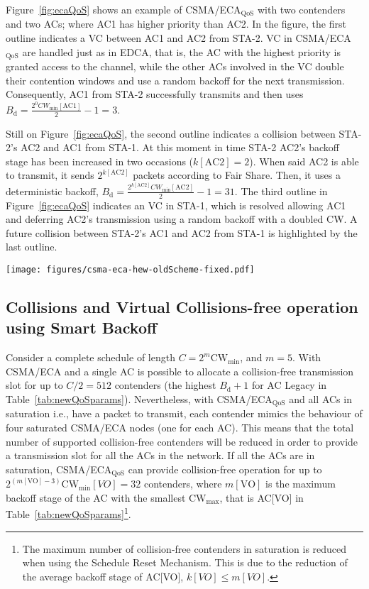 \documentclass[a4paper]{article}
\begin{document}
Figure~\ref{fig:ecaQoS} shows an example of CSMA/ECA$_{\text{QoS}}$ with two contenders and two ACs; where AC1 has higher priority than AC2. In the figure, the first outline indicates a VC between AC1 and AC2 from STA-2. VC in CSMA/ECA$_{\text{QoS}}$ are handled just as in EDCA, that is, the AC with the highest priority is granted access to the channel, while the other ACs involved in the VC double their contention windows and use a random backoff for the next transmission. Consequently, AC1 from STA-2 successfully transmits and then uses $B_{\text{d}}=\frac{2^{0}CW_{\min}[\text{AC1}]}{2}-1= 3$.

Still on Figure~\ref{fig:ecaQoS}, the second outline indicates a collision between STA-2's AC2 and AC1 from STA-1. At this moment in time STA-2 AC2's backoff stage has been increased in two occasions ($k[\text{AC2}]=2$). When said AC2 is able to transmit, it sends $2^{k[\text{AC2}]}$ packets according to Fair Share. Then, it uses a deterministic backoff, $B_{\text{d}}=\frac{2^{k[\text{AC2}]}CW_{\min}[\text{AC2}]}{2}-1=31$. The third outline in Figure~\ref{fig:ecaQoS} indicates an VC in STA-1, which is resolved allowing AC1 and deferring AC2's transmission using a random backoff with a doubled CW. A future collision between STA-2's AC1 and AC2 from STA-1 is highlighted by the last outline.

	\begin{figure*}[tb]
	\centering
		\texttt{[image: figures/csma-eca-hew-oldScheme-fixed.pdf]}
		\caption{An example of the temporal evolution of CSMA/ECA$_{\text{QoS}}$ in saturation ($CW_{\min}[\text{AC1,AC2}]=[8,16]$; $m[\text{AC1,AC2}]=[5,5]$)}
		\label{fig:ecaQoS}
	\end{figure*}

\subsection{Collisions and Virtual Collisions-free operation using Smart Backoff}\label{ECAqosCollisionFree}
Consider a complete schedule of length $C=2^{m}\text{CW}_{\min}$, and $m=5$. With CSMA/ECA and a single AC is possible to allocate a collision-free transmission slot for up to $C/2=512$ contenders (the highest $B_{\text{d}}+1$ for AC Legacy in Table~\ref{tab:newQoSparams}). Nevertheless, with CSMA/ECA$_{\text{QoS}}$ and all ACs in saturation i.e., have a packet to transmit, each contender mimics the behaviour of four saturated CSMA/ECA nodes (one for each AC). This means that the total number of supported collision-free contenders will be reduced in order to provide a transmission slot for all the ACs in the network. If all the ACs are in saturation, CSMA/ECA$_{\text{QoS}}$ can provide collision-free operation for up to $2^{(m[\text{VO}]-3)}\text{CW}_{\min}[VO] = 32$ contenders, where $m[\text{VO}]$ is the maximum backoff stage of the AC with the smallest CW$_{\max}$, that is AC[VO] in Table~\ref{tab:newQoSparams}\footnote{The maximum number of collision-free contenders in saturation is reduced when using the Schedule Reset Mechanism. This is due to the reduction of the average backoff stage of AC[VO], $k[VO]\leq m[VO]$.}. 
\end{document}
